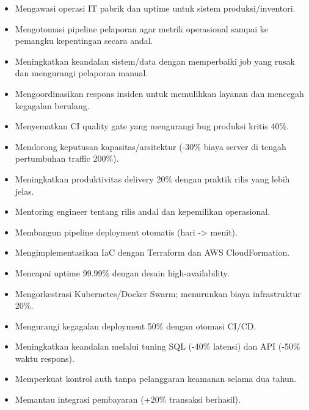 
\begin{itemize}
\item Mengawasi operasi IT pabrik dan uptime untuk sistem produksi/inventori.
\item Mengotomasi pipeline pelaporan agar metrik operasional sampai ke pemangku kepentingan secara andal.
\item Meningkatkan keandalan sistem/data dengan memperbaiki job yang rusak dan mengurangi pelaporan manual.
\item Mengoordinasikan respons insiden untuk memulihkan layanan dan mencegah kegagalan berulang.
\end{itemize}
\divider

\begin{itemize}
\item Menyematkan CI quality gate yang mengurangi bug produksi kritis 40\%.
\item Mendorong keputusan kapasitas/arsitektur (-30\% biaya server di tengah pertumbuhan traffic 200\%).
\item Meningkatkan produktivitas delivery 20\% dengan praktik rilis yang lebih jelas.
\item Mentoring engineer tentang rilis andal dan kepemilikan operasional.
\end{itemize}
\divider

\begin{itemize}
\item Membangun pipeline deployment otomatis (hari -> menit).
\item Mengimplementasikan IaC dengan Terraform dan AWS CloudFormation.
\item Mencapai uptime 99.99\% dengan desain high-availability.
\item Mengorkestrasi Kubernetes/Docker Swarm; menurunkan biaya infrastruktur 20\%.
\item Mengurangi kegagalan deployment 50\% dengan otomasi CI/CD.
\end{itemize}
\divider

\begin{itemize}
\item Meningkatkan keandalan melalui tuning SQL (-40\% latensi) dan API (-50\% waktu respons).
\item Memperkuat kontrol auth tanpa pelanggaran keamanan selama dua tahun.
\item Memantau integrasi pembayaran (+20\% transaksi berhasil).
\end{itemize}
\divider

